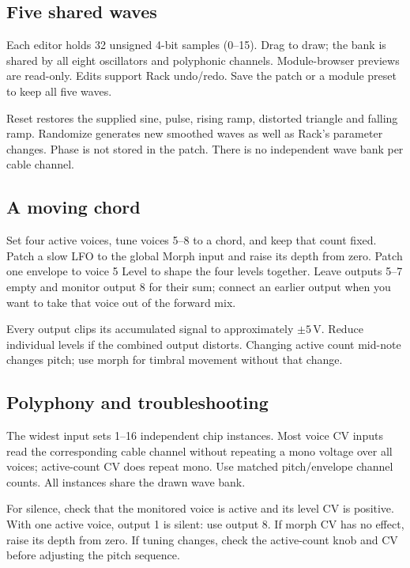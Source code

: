 \subsection{Five shared waves}
Each editor holds 32 unsigned 4-bit samples (0--15). Drag to draw; the bank is
shared by all eight oscillators and polyphonic channels. Module-browser previews are read-only. Edits support
Rack undo/redo. Save the patch or a module preset to keep all five waves.

Reset restores the supplied sine, pulse, rising ramp, distorted triangle and
falling ramp. Randomize generates new smoothed waves as well as Rack's
parameter changes. Phase is not stored in the patch. There is no independent
wave bank per cable channel.

\subsection{A moving chord}
Set four active voices, tune voices 5--8 to a chord, and keep that count fixed.
Patch a slow LFO to the global Morph input and raise its depth from zero.
Patch one envelope to voice 5 Level to shape the four levels together. Leave
outputs 5--7 empty and monitor output 8 for their sum; connect an earlier
output when you want to take that voice out of the forward mix.

Every output clips its accumulated signal to approximately $\pm5$\,V. Reduce
individual levels if the combined output distorts. Changing active count
mid-note changes pitch; use morph for timbral movement without that change.

\subsection{Polyphony and troubleshooting}
The widest input sets 1--16 independent chip instances. Most voice CV inputs
read the corresponding cable channel without repeating a mono voltage over
all voices; active-count CV does repeat mono. Use matched pitch/envelope
channel counts. All instances share the drawn wave bank.

For silence, check that the monitored voice is active and its level CV is
positive. With one active voice, output 1 is silent: use output 8. If morph
CV has no effect, raise its depth from zero. If tuning changes, check the
active-count knob and CV before adjusting the pitch sequence.

